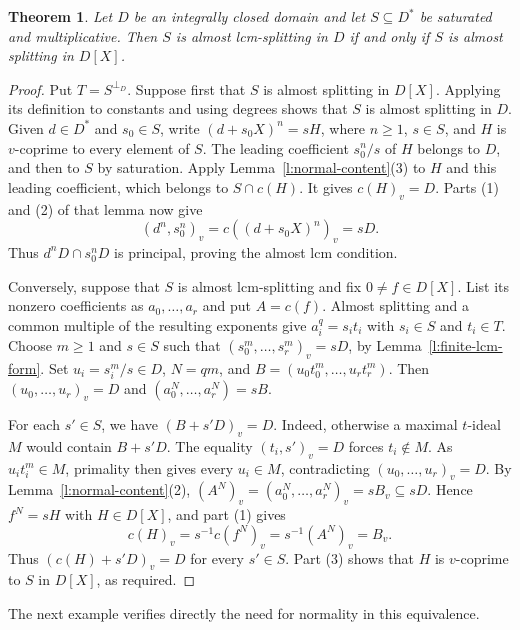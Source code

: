 \documentclass[11pt]{amsart}
\newtheorem{theorem}{Theorem}[section]
\theoremstyle{definition}
\theoremstyle{remark}
\begin{document}
\begin{theorem}\label{t:almost-lcm-polynomial-splitting}
Let $D$ be an integrally closed domain and let
$S\subseteq D^\ast$ be saturated and multiplicative.
Then $S$ is almost lcm-splitting in $D$ if and only if $S$
is almost splitting in $D[X]$.
\end{theorem}
\begin{proof}
Put $T=S^{\perp_D}$. Suppose first that $S$ is almost splitting
in $D[X]$. Applying its definition to constants and using
degrees shows that $S$ is almost splitting in $D$.
Given $d\in D^\ast$ and $s_0\in S$, write
$(d+s_0X)^n=sH$, where $n\geq1$, $s\in S$, and $H$ is
$v$-coprime to every element of $S$.
The leading coefficient $s_0^n/s$ of $H$ belongs to $D$, and
then to $S$ by saturation. Apply Lemma~\ref{l:normal-content}(3) to $H$ and this leading
coefficient, which belongs to $S\cap c(H)$. It gives $c(H)_v=D$. Parts (1) and (2) of that lemma now give
\[
 (d^n,s_0^n)_v=c((d+s_0X)^n)_v=sD.
\]
Thus $d^nD\cap s_0^nD$ is principal, proving the almost
lcm condition.

Conversely, suppose that $S$ is almost lcm-splitting and fix
$0\ne f\in D[X]$. List its nonzero coefficients as
$a_0,\ldots,a_r$ and put $A=c(f)$.
Almost splitting and a common multiple of the resulting
exponents give $a_i^q=s_it_i$ with $s_i\in S$ and $t_i\in T$.
Choose $m\geq1$ and $s\in S$ such that
$(s_0^m,\ldots,s_r^m)_v=sD$, by Lemma~\ref{l:finite-lcm-form}.
Set $u_i=s_i^m/s\in D$, $N=qm$, and
$B=(u_0t_0^m,\ldots,u_rt_r^m)$.
Then $(u_0,\ldots,u_r)_v=D$ and
$(a_0^N,\ldots,a_r^N)=sB$.

For each $s'\in S$, we have $(B+s'D)_v=D$.
Indeed, otherwise a maximal $t$-ideal $M$ would contain
$B+s'D$. The equality $(t_i,s')_v=D$ forces $t_i\notin M$.
As $u_it_i^m\in M$, primality then gives every $u_i\in M$,
contradicting $(u_0,\ldots,u_r)_v=D$.
By Lemma~\ref{l:normal-content}(2),
$(A^N)_v=(a_0^N,\ldots,a_r^N)_v=sB_v\subseteq sD$.
Hence $f^N=sH$ with $H\in D[X]$, and part (1) gives
\[
 c(H)_v=s^{-1}c(f^N)_v=s^{-1}(A^N)_v=B_v.
\]
Thus $(c(H)+s'D)_v=D$ for every $s'\in S$.
Part (3) shows that $H$ is $v$-coprime to $S$ in $D[X]$,
as required.
\end{proof}

The next example verifies directly the need for normality in
this equivalence.
\end{document}
